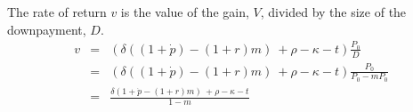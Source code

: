 The rate of return $v$ is the value of the gain, $V$, divided by  the size of the downpayment, $D$. 
\begin{eqnarray}
v&=&( \delta((1+\dot p)  - (1+r)m) \ + \rho   	-\kappa - t ) \frac{P_0}{D}   \nonumber\\
		&=&( \delta((1+\dot p)  - (1+r)m) \ + \rho   	-\kappa - t ) \frac{P_0}{P_0-mP_0}   \nonumber\\
		&=&\frac{ \delta(1+\dot p  - (1+r)m) \ + \rho   	-\kappa - t } {1-m} \label{Eqn:DecisionRule}
\end{eqnarray}







%
%

